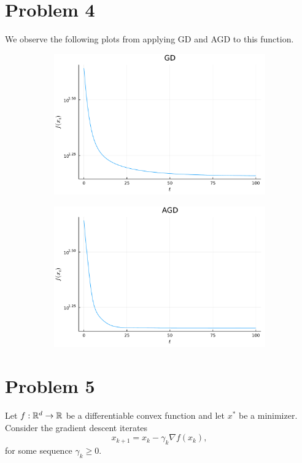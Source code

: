 \documentclass{article}
\begin{document}
\section{Problem 4}
We observe the following plots from applying GD and AGD to this function.
\begin{figure}[H]
	\centering
	\begin{subfigure}{0.495\linewidth}
		\centering
		\includegraphics[width=\linewidth]{prob4a.pdf}
	\end{subfigure}
	\begin{subfigure}{0.495\linewidth}
		\centering
		\includegraphics[width=\linewidth]{prob4b.pdf}
	\end{subfigure}
\end{figure}

\section{Problem 5}
Let $f:\mathbb{R}^d\to\mathbb{R}$ be a differentiable convex function and let $x^*$ be a minimizer. Consider the gradient descent iterates 
\[
x_{k+1}=x_k-\gamma_k\nabla f(x_k),
\]
for some sequence $\gamma_k\geq0$.
\end{document}
